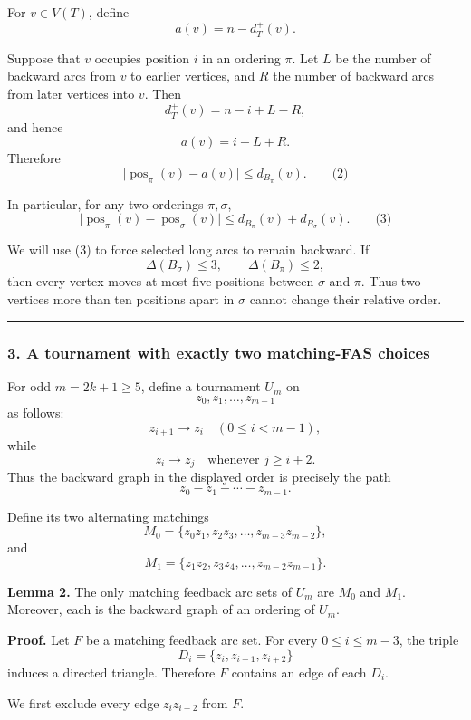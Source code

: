 \documentclass[
  11pt,
  a4paper,
]{article}
\begin{document}
For \(v\in V(T)\), define \[
a(v)=n-d_T^+(v).
\]

Suppose that \(v\) occupies position \(i\) in an ordering \(\pi\). Let
\(L\) be the number of backward arcs from \(v\) to earlier vertices, and
\(R\) the number of backward arcs from later vertices into \(v\). Then
\[
d_T^+(v)=n-i+L-R,
\] and hence \[
a(v)=i-L+R.
\] Therefore \[
\bigl|\operatorname{pos}_\pi(v)-a(v)\bigr|
   \le d_{B_\pi}(v). \qquad\text{(2)}
\]

In particular, for any two orderings \(\pi,\sigma\), \[
\bigl|\operatorname{pos}_\pi(v)-\operatorname{pos}_\sigma(v)\bigr|
 \le d_{B_\pi}(v)+d_{B_\sigma}(v). \qquad\text{(3)}
\]

We will use (3) to force selected long arcs to remain backward. If \[
\Delta(B_\sigma)\le3,\qquad \Delta(B_\pi)\le2,
\] then every vertex moves at most five positions between \(\sigma\) and
\(\pi\). Thus two vertices more than ten positions apart in \(\sigma\)
cannot change their relative order.

\begin{center}\rule{0.5\linewidth}{0.5pt}\end{center}

\subsubsection{3. A tournament with exactly two matching-FAS
choices}\label{a-tournament-with-exactly-two-matching-fas-choices}

For odd \(m=2k+1\ge5\), define a tournament \(U_m\) on \[
z_0,z_1,\ldots,z_{m-1}
\] as follows: \[
z_{i+1}\to z_i \quad(0\le i<m-1),
\] while \[
z_i\to z_j \quad\text{whenever }j\ge i+2.
\] Thus the backward graph in the displayed order is precisely the path
\[
z_0-z_1-\cdots-z_{m-1}.
\]

Define its two alternating matchings \[
M_0=\{z_0z_1,z_2z_3,\ldots,z_{m-3}z_{m-2}\},
\] and \[
M_1=\{z_1z_2,z_3z_4,\ldots,z_{m-2}z_{m-1}\}.
\]

\textbf{Lemma 2.} The only matching feedback arc sets of \(U_m\) are
\(M_0\) and \(M_1\). Moreover, each is the backward graph of an ordering
of \(U_m\).

\textbf{Proof.} Let \(F\) be a matching feedback arc set. For every
\(0\le i\le m-3\), the triple \[
D_i=\{z_i,z_{i+1},z_{i+2}\}
\] induces a directed triangle. Therefore \(F\) contains an edge of each
\(D_i\).

We first exclude every edge \(z_i z_{i+2}\) from \(F\).
\end{document}
